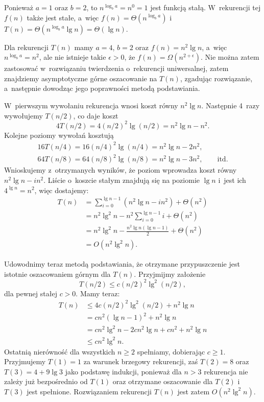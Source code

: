 \exercise %
Ponieważ $a=1$ oraz $b=2$, to $n^{\log_ba}=n^0=1$ jest funkcją stałą. W~rekurencji tej $f(n)$ także jest stałe, a~więc $f(n)=\Theta(n^{\log_ba})$ i~$T(n)=\Theta(n^{\log_ba}\lg n)=\Theta(\lg n)$.

\exercise %
Dla rekurencji $T(n)$ mamy $a=4$, $b=2$ oraz $f(n)=n^2\lg n$, a~więc $n^{\log_ba}=n^2$, ale nie istnieje takie $\epsilon>0$, że $f(n)=\Omega(n^{2+\epsilon})$. Nie można zatem zastosować w~rozwiązaniu twierdzenia o~rekurencji uniwersalnej, zatem znajdziemy asymptotyczne górne oszacowanie na $T(n)$, zgadując rozwiązanie, a~następnie dowodząc jego poprawności metodą podstawiania.

W~pierwszym wywołaniu rekurencja wnosi koszt równy $n^2\lg n$. Następnie 4~razy wywołujemy $T(n/2)$, co daje koszt
\[
	4T(n/2) = 4(n/2)^2\lg(n/2) = n^2\lg n-n^2.
\]
Kolejne poziomy wywołań kosztują
\begin{gather*}
	16T(n/4) = 16(n/4)^2\lg(n/4) = n^2\lg n-2n^2, \qquad\phantom{\text{itd.}} \\
	64T(n/8) = 64(n/8)^2\lg(n/8) = n^2\lg n-3n^2, \qquad\text{itd.}
\end{gather*}
Wnioskujemy z~otrzymanych wyników, że  poziom wprowadza koszt równy $n^2\lg n-in^2$. Liście o~koszcie stałym znajdują się na poziomie $\lg n$ i~jest ich $4^{\lg n}=n^2$, więc dostajemy:
\begin{align*}
	T(n) &= \sum_{i=0}^{\lg n-1}(n^2\lg n-in^2)+\Theta(n^2) \\
	&= n^2\lg^2n-n^2\sum_{i=0}^{\lg n-1}i+\Theta(n^2) \\[1mm]
	&= n^2\lg^2n-\frac{n^2\lg n(\lg n-1)}{2}+\Theta(n^2) \\[1mm]
	&= O(n^2\lg^2n).
\end{align*}

Udowodnimy teraz metodą podstawiania, że otrzymane przypuszczenie jest istotnie oszacowaniem górnym dla $T(n)$. Przyjmijmy założenie
\[
	T(n/2) \le c(n/2)^2\lg^2(n/2),
\]
dla pewnej stałej $c>0$. Mamy teraz:
\begin{align*}
	T(n) &\le 4c(n/2)^2\lg^2(n/2)+n^2\lg n \\
	&= cn^2(\lg n-1)^2+n^2\lg n \\
	&= cn^2\lg^2n-2cn^2\lg n+cn^2+n^2\lg n \\
	&\le cn^2\lg^2n.
\end{align*}
Ostatnią nierówność dla wszystkich $n\ge2$ spełniamy, dobierając $c\ge1$. Przyjmujemy $T(1)=1$ za warunek brzegowy rekurencji, zaś $T(2)=8$ oraz $T(3)=4+9\lg3$ jako podstawę indukcji, ponieważ dla $n>3$ rekurencja nie zależy już bezpośrednio od $T(1)$ oraz otrzymane oszacowanie dla $T(2)$ i~$T(3)$ jest spełnione. Rozwiązaniem rekurencji $T(n)$ jest zatem $O(n^2\lg^2n)$.

